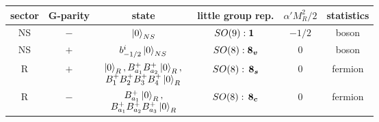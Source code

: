 \begin{tabular}{|c|c|c|c|c|c|}
    \hline  sector & G-parity & state & little group rep. & $\alpha' M^2_R /2$ & statistics \\ \hline
          NS & $-$ & $\ket{0}_{NS}$   & $SO(9): \boldsymbol{1} \,$ & $-1/2$ & boson   \\ \hline
      NS & $+$ & $b^i_{-1/2} \ket{0}_{NS}$   & $SO(8): \boldsymbol{8_v}$  & 0 & boson \\ \hline 
          \multirow{2}{*}{R} & \multirow{2}{*}{$+$} & \multirow{2}{*}{$\begin{array}{c} 
              \ket{0}_{R}, B^+_{a_1}B^+_{a_2}\ket{0}_{R}, \\ 
              B^+_{1}B^+_{2}B^+_{3}B^+_{4} \ket{0}_{R} 
          \end{array}$} & \multirow{2}{*}{$SO(8): \, \boldsymbol{8_s}$} & \multirow{2}{*}{$0$} & \multirow{2}{*}{fermion} \\ 
          & & & & & \\ \hline
          \multirow{2}{*}{R} & \multirow{2}{*}{$-$} & \multirow{2}{*}{$\begin{array}{c} 
              B^+_{a_1} \ket{0}_{R}, \\ 
              B^+_{a_1}B^+_{a_2}B^+_{a_3}\ket{0}_{R}
          \end{array}$} & \multirow{2}{*}{$SO(8): \, \boldsymbol{8_c}$} & \multirow{2}{*}{$0$} & \multirow{2}{*}{fermion} \\ 
          & & & & & \\ \hline
  \end{tabular}